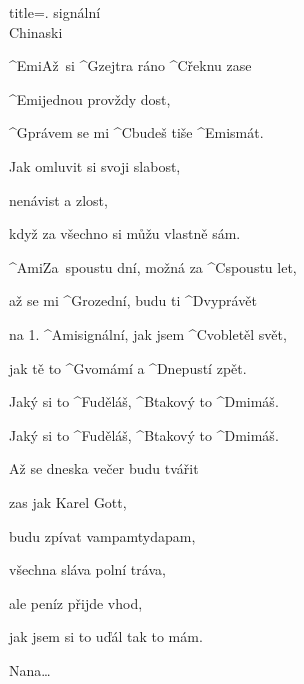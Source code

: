 \begin{song}{title=\predtitle {}. signální \\\large Chinaski  \vspace*{-0.3cm}}  %
\begin{centerjustified}
\nejnejvetsi
\sloka
	^{Emi\z }Až~si ^{G\z }zejtra ráno ^{C}řeknu zase

	^{Emi}jednou provždy dost,

	^{G\z }právem se mi ^{C\z }budeš tiše ^{Emi}smát.

	Jak omluvit si svoji slabost,

	nenávist a zlost,

	když za všechno si můžu vlastně sám.

	^{Ami\z}Za~spoustu dní, možná za ^{C\z }spoustu let,

	až se mi ^{G\z }rozední, budu ti ^{D\z }vyprávět

	na 1. ^{Ami\z }signální, jak jsem ^{C\z }vobletěl svět,

	jak tě to ^{G\z }vomámí a ^{D\z }nepustí zpět.

	Jaký si to ^{F\z }uděláš, ^{B\z }takový to ^{Dmi}máš.

	Jaký si to ^{F\z }uděláš, ^{B\z }takový to ^{Dmi}máš.

\sloka
	Až se dneska večer budu tvářit

	zas jak Karel Gott,

	budu zpívat vampamtydapam,

	všechna sláva polní tráva,

	ale peníz přijde vhod,

	jak jsem si to uďál tak to mám.


\sloka Nana\elipsa\dots

\end{centerjustified}
\setcounter{Slokočet}{0}
\end{song}
